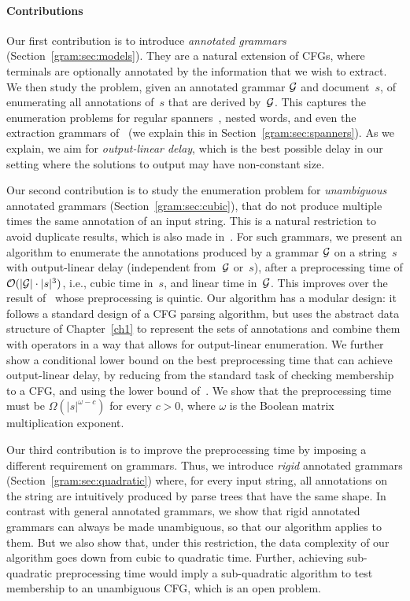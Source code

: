     \paragraph{Contributions}
    Our first contribution is to introduce \emph{annotated grammars} (Section~\ref{gram:sec:models}).
    They are a natural extension of CFGs, where terminals are optionally annotated by the information that we wish to extract.
    We then study the problem, given an annotated grammar $\mathcal{G}$ and document~$s$, of
    enumerating all annotations of~$s$ that are derived by~$\mathcal{G}$.
This captures the enumeration problems for regular spanners~\cite{FlorenzanoRUVV18,amarilli2020constant}, nested words,
and
    even the extraction grammars of~\cite{Peterfreund21} (we explain this in Section~\ref{gram:sec:spanners}). 
    As we explain, we aim for \emph{output-linear delay}, which is the best
    possible delay in our setting where the solutions to output may have
    non-constant size. 

    Our second contribution is to study the enumeration problem for \emph{unambiguous} annotated grammars (Section~\ref{gram:sec:cubic}),
    that do not produce multiple times the same annotation of an input string. This is a natural restriction to avoid duplicate results, %
    which is also made in~\cite{Peterfreund21}. 
  For such grammars, 
%
    we present an algorithm to enumerate the annotations produced by a grammar $\mathcal{G}$ on a string~$s$ with output-linear delay (independent from~$\mathcal{G}$ or~$s$), after a preprocessing time of $\mathcal{O}(|\mathcal{G}| \cdot |s|^3)$, i.e., cubic time in~$s$, and linear time in~$\mathcal{G}$. 
    This improves over the result of~\cite{Peterfreund21} whose preprocessing is quintic. 
    Our algorithm has a modular design: it follows a standard design of a CFG
    parsing algorithm, but uses the abstract data structure
    of Chapter~\ref{ch1}
    to represent
    the sets of annotations and combine them with operators in a way that allows for output-linear enumeration. 
    We further show a conditional lower bound on the best preprocessing time that can achieve output-linear delay, by reducing from the standard task of checking membership to a CFG, and using the lower bound of~\cite{AbboudBW18}. We show that the preprocessing time must be $\Omega(|s|^{\omega-c})$ for every $c > 0$, where $\omega$ is
    the Boolean matrix multiplication exponent.

    Our third contribution is to improve the preprocessing time by imposing a different requirement on grammars. Thus, we introduce \emph{rigid} annotated grammars (Section~\ref{gram:sec:quadratic}) where, for every input string, all annotations on the string are intuitively produced by parse trees that have the same shape. In contrast with general annotated grammars, we show that rigid annotated grammars can always be made unambiguous, so that our algorithm applies to them. But we also show that, under this restriction, the data complexity of our algorithm goes down from cubic to quadratic time.
    Further, achieving sub-quadratic preprocessing time would imply a sub-quadratic algorithm to test membership to an unambiguous CFG, which is an open problem.

